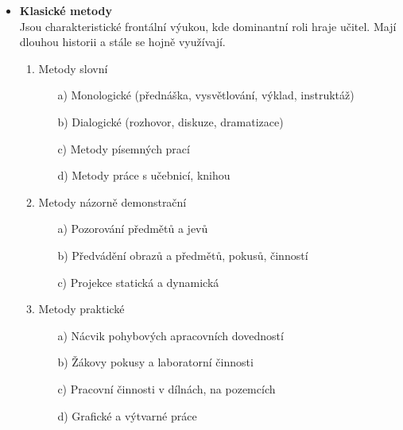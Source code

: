    \begin{itemize}
        \item \textbf{Klasické metody} \\
            Jsou charakteristické frontální výukou, kde dominantní roli hraje učitel. Mají dlouhou historii a stále se hojně využívají.
            
            \begin{enumerate}
                \item Metody slovní
                    \begin{itemize}
                        \item[a)] Monologické (přednáška, vysvětlování, výklad, instruktáž)
                        \item[b)] Dialogické (rozhovor, diskuze, dramatizace)
                        \item[c)] Metody písemných prací
                        \item[d)] Metody práce s učebnicí, knihou
                    \end{itemize}{}
                    
                \item Metody názorně demonstrační
                    \begin{itemize}
                        \item[a)] Pozorování předmětů a jevů
                        \item[b)] Předvádění obrazů a předmětů, pokusů, činností
                        \item[c)] Projekce statická a dynamická
                    \end{itemize}{}

                \item Metody praktické
                    \begin{itemize}
                        \item[a)] Nácvik pohybových apracovních dovedností
                        \item[b)] Žákovy pokusy a laboratorní činnosti
                        \item[c)] Pracovní činnosti v dílnách, na pozemcích
                        \item[d)] Grafické a výtvarné práce
                    \end{itemize}{}
                    
            \end{enumerate}
            

\end{itemize}
